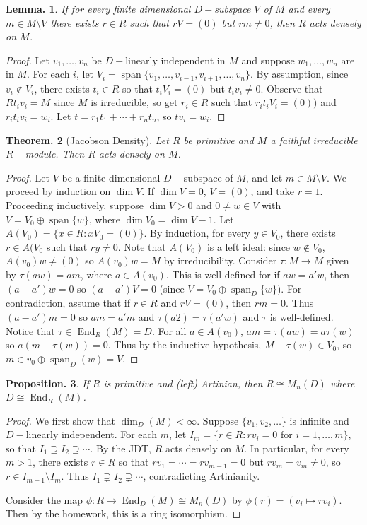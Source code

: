 \documentclass[11pt, a4paper]{memoir}
\theoremstyle{change}
\newtheorem{theorem}{Theorem.}[section]
\newtheorem{lemma}[theorem]{Lemma.}
\newtheorem{proposition}[theorem]{Proposition.}
\theoremstyle{plain}
\theoremstyle{nonumberplain}
\newtheorem{proof}{Proof}
\DeclareMathOperator{\End}{End}
\DeclareMathOperator{\spn}{span}
\numberwithin{equation}{section}
\begin{document}
\begin{lemma}
    If for every finite dimensional $D-$subspace $V$ of $M$ and every $m\in M\setminus V$ there exists $r\in R$ such that $rV=(0)$ but $rm\neq 0$, then $R$ acts densely on $M$.
\end{lemma}
\begin{proof}
    Let $v_1,\ldots,v_n$ be $D-$linearly independent in $M$ and suppose $w_1,\ldots,w_n$ are in $M$.
    For each $i$, let $V_i=\spn\{v_1,\ldots,v_{i-1},v_{i+1},\ldots,v_n\}$.
    By assumption, since $v_i\notin V_i$, there exists $t_i\in R$ so that $t_iV_i=(0)$ but $t_iv_i\neq 0$.
    Observe that $Rt_iv_i=M$ since $M$ is irreducible, so get $r_i\in R$ such that $r_it_iV_i=(0))$ and $r_it_iv_i=w_i$.
    Let $t=r_1t_1+\cdots+r_nt_n$, so $tv_i=w_i$.
\end{proof}
\begin{theorem}[Jacobson Density]
    Let $R$ be primitive and $M$ a faithful irreducible $R-$module.
    Then $R$ acts densely on $M$.
\end{theorem}
\begin{proof}
    Let $V$ be a finite dimensional $D-$subspace of $M$, and let $m\in M\setminus V$.
    We proceed by induction on $\dim V$.
    If $\dim V=0$, $V=(0)$, and take $r=1$.
    Proceeding inductively, suppose $\dim V>0$ and $0\neq w\in V$ with $V=V_0\oplus\spn\{w\}$, where $\dim V_0=\dim V-1$.
    Let $A(V_0)=\{x\in R:xV_0=(0)\}$.
    By induction, for every $y\in V_0$, there exists $r\in A(V_0$ such that $ry\neq 0$.
    Note that $A(V_0)$ is a left ideal: since $w\notin V_0$, $A(v_0)w\neq(0)$ so $A(v_0)w=M$ by irreducibility.
    Consider $\tau:M\to M$ given by $\tau(aw)=am$, where $a\in A(v_0)$.
    This is well-defined for if $aw=a'w$, then $(a-a')w=0$ so $(a-a')V=0$ (since $V=V_0\oplus\spn_D\{w\}$).
    For contradiction, assume that if $r\in R$ and $rV=(0)$, then $rm=0$.
    Thus $(a-a')m=0$ so $am=a'm$ and $\tau(a2)=\tau(a'w)$ and $\tau$ is well-defined.
    Notice that $\tau\in\End_R(M)=D$.
    For all $a\in A(v_0)$, $am=\tau(aw)=a\tau(w)$ so $a(m-\tau(w))=0$.
    Thus by the inductive hypothesis, $M-\tau(w)\in V_0$, so $m\in v_0\oplus\spn_D(w)=V$.
\end{proof}
\begin{proposition}
    If $R$ is primitive and (left) Artinian, then $R\cong M_n(D)$ where $D\cong\End_R(M)$.
\end{proposition}
\begin{proof}
    We first show that $\dim_D(M)<\infty$.
    Suppose $\{v_1,v_2,\ldots\}$ is infinite and $D-$linearly independent.
    For each $m$, let $I_m=\{r\in R:rv_i=0\text{ for }i=1,\ldots,m\}$, so that $I_1\supseteq I_2\supseteq\cdots$.
    By the JDT, $R$ acts densely on $M$.
    In particular, for every $m>1$, there exists $r\in R$ so that $rv_1=\cdots=rv_{m-1}=0$ but $rv_m=v_m\neq 0$, so $r\in I_{m-1}\setminus I_m$.
    Thus $I_1\supsetneq I_2\supsetneq\cdots$, contradicting Artinianity.

    Consider the map $\phi:R\to\End_D(M)\cong M_n(D)$ by $\phi(r)=(v_i\mapsto rv_i)$.
    Then by the homework, this is a ring isomorphism.
\end{proof}
\end{document}
